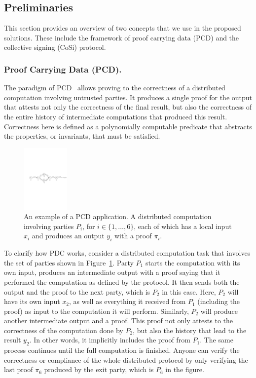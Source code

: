 \subsection{Preliminaries}
\label{prelim}
This section provides an overview of two concepts that we use in the 
proposed solutions. These include the framework of proof carrying data (PCD) 
and the collective signing (CoSi) protocol.


\subsubsection{Proof Carrying Data (PCD).}
The paradigm of PCD~\cite{chiesa2010proof} allows proving to the correctness of a distributed 
computation involving untrusted parties. It produces a single proof for the output 
that attests not only the correctness of the final result, but also 
the correctness of the entire history of intermediate computations that produced 
this result. Correctness here is defined as a polynomially computable predicate that 
abstracts the properties, or invariants, that must be satisfied.


\begin{figure}[h!]
\centerline{
\includegraphics[height= 1.3in, width = 1.0\columnwidth]{figures/pcd-diagram.pdf}}
\caption{An example of a PCD application. A distributed computation involving parties $P_i$, for 
$i \in \{1, \dots, 6\}$, each 
of which has a local input $x_i$ and produces an output $y_i$ with a proof $\pi_i$. }
\label{pcd-diagram}
\end{figure}


To clarify how PDC works, consider a distributed computation task that involves 
the set of parties shown in Figure~\ref{pcd-diagram}. Party $P_1$ starts the computation with its 
own input, produces an intermediate output with a proof saying that it performed 
the computation as defined by the protocol. It then sends both the output and the proof 
to the next party, which is $P_2$ in this case. Here, $P_2$ will 
have its own input $x_2$, as well as everything it received from $P_1$ (including the proof) 
as input to the computation it will perform. Similarly, $P_2$ will produce another 
intermediate output and a proof. This proof not only attests to the correctness of the 
computation done by $P_2$, but also the history that lead to the result $y_2$. In other 
words, it implicitly includes 
the proof from $P_1$. The same process continues until the full computation is finished. 
Anyone can verify the correctness or compliance of the whole distributed protocol by 
only verifying the last proof $\pi_6$ produced by the exit party, which is $P_6$ in the figure.


